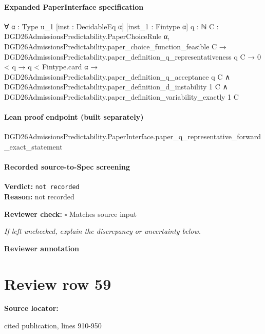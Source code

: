 \documentclass[10pt]{article}
\newcommand{\reviewerbox}{%
  \par\noindent\fbox{\parbox{0.96\linewidth}{\rule{0pt}{0.38in}}}\par
}
\newcommand{\reviewmatch}[1]{%
  \par\noindent\textbf{Reviewer check:} $\square$\; #1\par
  \noindent\emph{If left unchecked, explain the discrepancy or uncertainty below.}\par
}
\begin{document}
\paragraph{Expanded PaperInterface specification}
\begin{ReviewVerbatim}
∀ {α : Type u_1} [inst : DecidableEq α] [inst_1 : Fintype α] {q : ℕ}
  {C : DGD26AdmissionsPredictability.PaperChoiceRule α},
  DGD26AdmissionsPredictability.paper_choice_function_feasible C →
    DGD26AdmissionsPredictability.paper_definition_q_representativeness q C →
      0 < q →
        q < Fintype.card α →
          DGD26AdmissionsPredictability.paper_definition_q_acceptance q C ∧
            DGD26AdmissionsPredictability.paper_definition_d_instability 1 C ∧
              DGD26AdmissionsPredictability.paper_definition_variability_exactly 1 C
\end{ReviewVerbatim}

\paragraph{Lean proof endpoint (built separately)}\begin{ReviewVerbatim}
DGD26AdmissionsPredictability.PaperInterface.paper_q_representative_forward_exact_statement
\end{ReviewVerbatim}

\paragraph{Recorded source-to-Spec screening}
\textbf{Verdict:} \texttt{not recorded}
\\
\textbf{Reason:} not recorded
\reviewmatch{Matches source input}
\noindent\textbf{Reviewer annotation}\par
\reviewerbox
\clearpage
\hypertarget{source-claim-3d12c759820fa6e4}{}
\section*{Review row 59}
\textbf{Source locator:} {\footnotesize\raggedright cited publication, lines 910-\allowbreak{}950\par}
\end{document}
